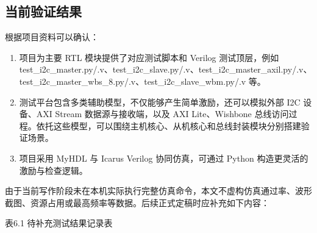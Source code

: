 \documentclass[12pt,a4paper]{article}
\numberwithin{equation}{section}
\providecommand{\tightlist}{%
  \setlength{\itemsep}{0pt}\setlength{\parskip}{0pt}}
\begin{document}
\subsection{当前验证结果}\label{ux5f53ux524dux9a8cux8bc1ux7ed3ux679c}

根据项目资料可以确认：

\begin{enumerate}
\def\labelenumi{\arabic{enumi}.}
\tightlist
\item
  项目为主要 RTL 模块提供了对应测试脚本和 Verilog 测试顶层，例如
  test\_i2c\_master.py/.v、test\_i2c\_slave.py/.v、test\_i2c\_master\_axil.py/.v、test\_i2c\_master\_wbs\_8.py/.v、test\_i2c\_slave\_wbm.py/.v
  等。
\item
  测试平台包含多类辅助模型，不仅能够产生简单激励，还可以模拟外部 I2C
  设备、AXI Stream 数据源与接收端，以及 AXI Lite、Wishbone
  总线访问过程。依托这些模型，可以围绕主机核心、从机核心和总线封装模块分别搭建验证场景。
\item
  项目采用 MyHDL 与 Icarus Verilog 协同仿真，可通过 Python
  构造更灵活的激励与检查逻辑。
\end{enumerate}

由于当前写作阶段未在本机实际执行完整仿真命令，本文不虚构仿真通过率、波形截图、资源占用或最高频率等数据。后续正式定稿时应补充如下内容：

表6.1 待补充测试结果记录表
\end{document}

